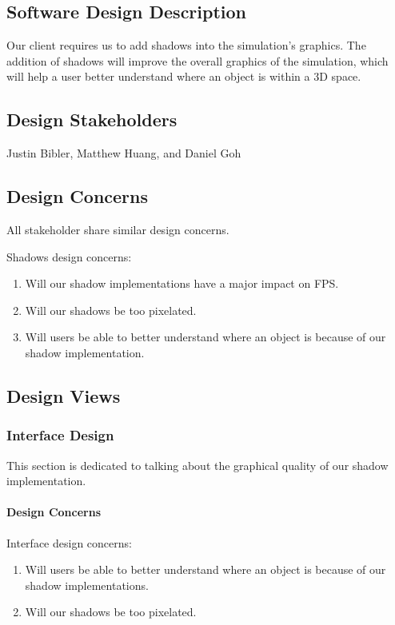 ﻿\documentclass[10pt,journal,compsoc,draftclsnofoot]{IEEEtran}
\begin{document}
\begin{flushleft}
\normalsize
\subsection{Software Design Description}
Our client requires us to add shadows into the simulation's graphics.
The addition of shadows will improve the overall graphics of the simulation, which will help a user better understand where an object is within a 3D space.

\subsection{Design Stakeholders}
Justin Bibler, Matthew Huang, and Daniel Goh

\subsection{Design Concerns}
All stakeholder share similar design concerns.

Shadows design concerns:
\begin{enumerate}
\item Will our shadow implementations have a major impact on FPS.
\item Will our shadows be too pixelated.
\item Will users be able to better understand where an object is because of our shadow implementation.
\end{enumerate}

\newpage

\subsection{Design Views}
\subsubsection{Interface Design}
This section is dedicated to talking about the graphical quality of our shadow implementation.

\paragraph{Design Concerns}
Interface design concerns:
\begin{enumerate}
\item Will users be able to better understand where an object is because of our shadow implementations.
\item Will our shadows be too pixelated.
\end{enumerate}


\end{flushleft}
\end{document}
